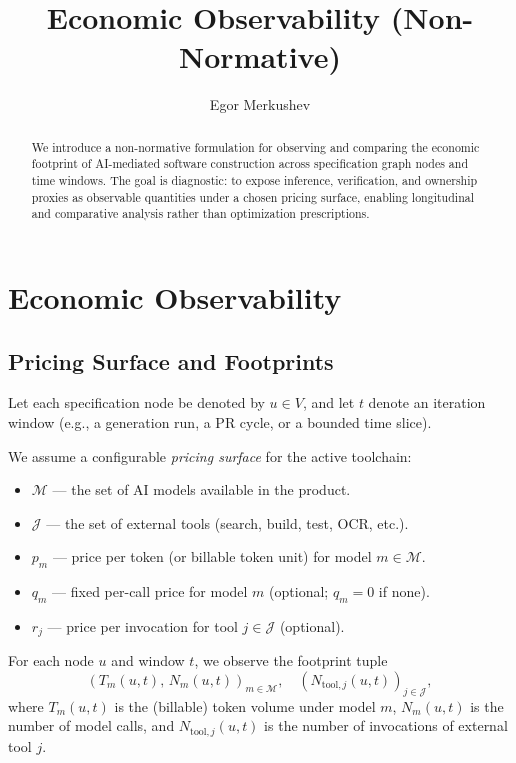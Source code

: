 \documentclass{aastex701}
\begin{document}
\title{Economic Observability (Non-Normative)}

\author{Egor Merkushev}

\begin{abstract}
We introduce a non-normative formulation for observing and comparing the
economic footprint of AI-mediated software construction across specification
graph nodes and time windows. The goal is diagnostic: to expose inference,
verification, and ownership proxies as observable quantities under a chosen
pricing surface, enabling longitudinal and comparative analysis rather than
optimization prescriptions.
\end{abstract}


\section{Economic Observability}

\subsection{Pricing Surface and Footprints}

Let each specification node be denoted by $u \in V$, and let $t$ denote an
iteration window (e.g., a generation run, a PR cycle, or a bounded time slice).

We assume a configurable \emph{pricing surface} for the active toolchain:

\begin{itemize}
\item $\mathcal{M}$ --- the set of AI models available in the product.
\item $\mathcal{J}$ --- the set of external tools (search, build, test, OCR, etc.).
\item $p_m$ --- price per token (or billable token unit) for model $m \in \mathcal{M}$.
\item $q_m$ --- fixed per-call price for model $m$ (optional; $q_m=0$ if none).
\item $r_j$ --- price per invocation for tool $j \in \mathcal{J}$ (optional).
\end{itemize}

For each node $u$ and window $t$, we observe the footprint tuple
\[
\left( T_m(u,t),\, N_m(u,t) \right)_{m \in \mathcal{M}},\quad
\left( N_{\mathrm{tool},j}(u,t) \right)_{j \in \mathcal{J}},
\]
where $T_m(u,t)$ is the (billable) token volume under model $m$,
$N_m(u,t)$ is the number of model calls, and $N_{\mathrm{tool},j}(u,t)$ is
the number of invocations of external tool $j$.
\end{document}
